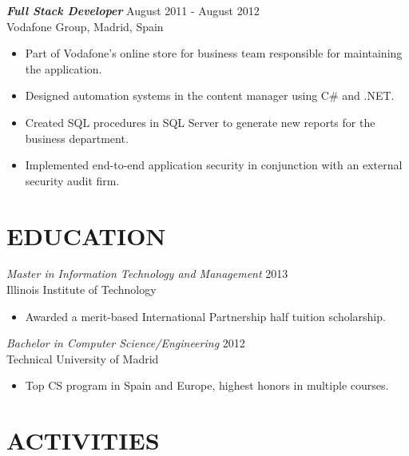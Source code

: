 \documentclass[overlapped, 10pt]{res} %
\begin{document}
\begin{resume}
{\sl \textbf{Full Stack Developer}} \hfill August 2011 - August 2012 \\
Vodafone Group, Madrid, Spain
\begin{itemize} 
\item Part of Vodafone’s online store for business team responsible for maintaining the application.
\item Designed automation systems in the content manager using C\# and .NET.
\item Created SQL procedures in SQL Server to generate new reports for the business department.
\item Implemented end-to-end application security in conjunction with an external security audit firm.
\end{itemize} 

 
\section{EDUCATION}\smallskip

{\sl Master in Information Technology and Management} \hfill 2013 \\
Illinois Institute of Technology
\begin{itemize}
\item Awarded a merit-based International Partnership half tuition scholarship.
\end{itemize} 

{\sl Bachelor in Computer Science/Engineering} \hfill 2012 \\
Technical University of Madrid
\begin{itemize} \itemsep -2pt %
\item Top CS program in Spain and Europe, highest honors in multiple courses.
\end{itemize}


\section{ACTIVITIES}\smallskip


\end{resume}
\end{document}
